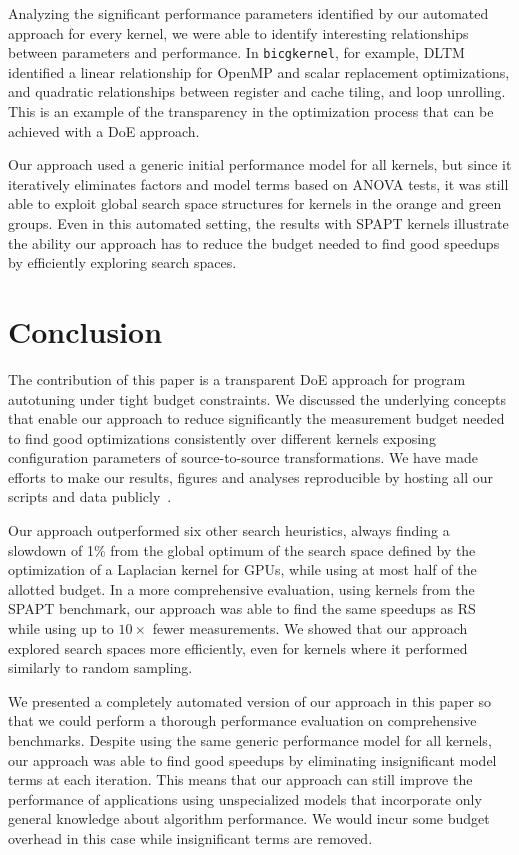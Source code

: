 \documentclass[conference]{IEEEtran}
\begin{document}
Analyzing  the significant  performance parameters  identified by  our automated
approach for  every kernel, we  were able to identify  interesting relationships
between parameters and performance. In  \texttt{bicgkernel}, for example, DLTM identified
a  linear relationship  for  OpenMP and  scalar  replacement optimizations,  and
quadratic   relationships  between   register   and  cache   tiling,  and   loop
unrolling. This  is an example of  the transparency in the  optimization process
that can be achieved with a DoE approach.

Our approach used a generic initial performance model for all kernels, but since
it iteratively eliminates  factors and model terms based on  ANOVA tests, it was
still able to  exploit global search space structures for  kernels in the orange
and green groups. Even in this automated setting, the results with SPAPT kernels
illustrate the ability our approach has to reduce the budget needed to find good
speedups by efficiently exploring search spaces.
\section{Conclusion}
\label{sec:orgdb06758}
The  contribution of  this  paper  is a  transparent  DoE  approach for  program
autotuning under tight budget constraints.  We discussed the underlying concepts
that enable our  approach to reduce significantly the  measurement budget needed
to  find  good  optimizations   consistently  over  different  kernels  exposing
configuration  parameters  of  source-to-source transformations.  We  have  made
efforts to  make our results, figures  and analyses reproducible by  hosting all
our scripts and data publicly~\cite{bruel2018ccgrid19}.

Our approach outperformed six other search heuristics, always finding a slowdown
of 1\% from the global optimum of the search space defined by the optimization of
a Laplacian kernel for GPUs, while using at most half of the allotted budget. In
a more  comprehensive evaluation,  using kernels from  the SPAPT  benchmark, our
approach was able to find the same speedups  as RS while using up to \(10\times\) fewer
measurements.  We  showed   that  our  approach  explored   search  spaces  more
efficiently, even for kernels where it performed similarly to random sampling.

We presented  a completely automated  version of our  approach in this  paper so
that  we  could  perform  a thorough  performance  evaluation  on  comprehensive
benchmarks. Despite  using the same  generic performance model for  all kernels,
our approach was  able to find good speedups by  eliminating insignificant model
terms at  each iteration.  This means  that our approach  can still  improve the
performance  of applications  using unspecialized  models that  incorporate only
general  knowledge  about algorithm  performance.  We  would incur  some  budget
overhead in this case while insignificant terms are removed.
\end{document}
